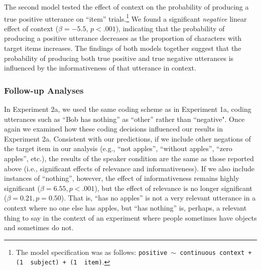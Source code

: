 \documentclass[man, floatsintext, noapacite]{apa6}
\begin{document}
The second model tested the effect of context on the probability of producing a true positive utterance on ``item'' trials.\footnote{The model specification was as follows: \texttt{positive $\sim$  continuous context + (1~\textbar~subject) +  (1~\textbar~item)}.} We found a significant \textit{negative} linear effect of context ($\beta= -5.5$, $p< .001$), indicating that the probability of producing a positive utterance decreases as the proportion of characters with target items increases. The findings of both models together suggest that the probability of producing both true positive and true negative utterances is influenced by the informativeness of that utterance in context.

\subsubsection{Follow-up Analyses}

In Experiment 2a, we used the same coding scheme as in Experiment 1a, coding utterances such as “Bob has nothing” as “other” rather than “negative". Once again we examined how these coding decisions influenced our results in Experiment 2a. Consistent with our predictions, if we include other negations of the target item in our analysis (e.g., “not apples”, “without apples”, “zero apples”, etc.), the results of the speaker condition are the same as those reported above (i.e., significant effects of relevance and informativeness). If we also include instances of “nothing”, however, the effect of informativeness remains highly significant ($\beta = 6.55, p < .001$), but the effect of relevance is no longer significant ($\beta = 0.21, p = 0.50$). That is, “has no apples” is not a very relevant utterance in a context where no one else has apples, but “has nothing” is, perhaps, a relevant thing to say in the context of an experiment where people sometimes have objects and sometimes do not.
\end{document}
